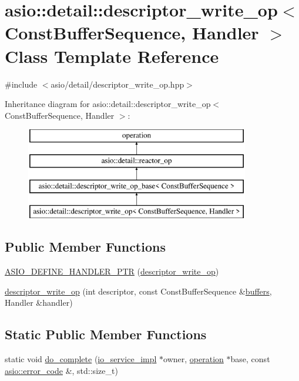 \hypertarget{classasio_1_1detail_1_1descriptor__write__op}{}\section{asio\+:\+:detail\+:\+:descriptor\+\_\+write\+\_\+op$<$ Const\+Buffer\+Sequence, Handler $>$ Class Template Reference}
\label{classasio_1_1detail_1_1descriptor__write__op}


{\ttfamily \#include $<$asio/detail/descriptor\+\_\+write\+\_\+op.\+hpp$>$}

Inheritance diagram for asio\+:\+:detail\+:\+:descriptor\+\_\+write\+\_\+op$<$ Const\+Buffer\+Sequence, Handler $>$\+:\begin{figure}[H]
\begin{center}
\leavevmode
\includegraphics[height=4.000000cm]{classasio_1_1detail_1_1descriptor__write__op}
\end{center}
\end{figure}
\subsection*{Public Member Functions}
\begin{DoxyCompactItemize}
\item 
\hyperlink{classasio_1_1detail_1_1descriptor__write__op_a71be8a5f4433a363ae686fedbf791026}{A\+S\+I\+O\+\_\+\+D\+E\+F\+I\+N\+E\+\_\+\+H\+A\+N\+D\+L\+E\+R\+\_\+\+P\+T\+R} (\hyperlink{classasio_1_1detail_1_1descriptor__write__op}{descriptor\+\_\+write\+\_\+op})
\item 
\hyperlink{classasio_1_1detail_1_1descriptor__write__op_a724881561745343c0d8e02a766c37be0}{descriptor\+\_\+write\+\_\+op} (int descriptor, const Const\+Buffer\+Sequence \&\hyperlink{group__async__read_ga54dede45c3175148a77fe6635222c47d}{buffers}, Handler \&handler)
\end{DoxyCompactItemize}
\subsection*{Static Public Member Functions}
\begin{DoxyCompactItemize}
\item 
static void \hyperlink{classasio_1_1detail_1_1descriptor__write__op_acfaa13c4493817c6ed5ecb2eb35a3eaa}{do\+\_\+complete} (\hyperlink{namespaceasio_1_1detail_a6d61d9b8e53c11288be549d82aec5a42}{io\+\_\+service\+\_\+impl} $\ast$owner, \hyperlink{namespaceasio_1_1detail_a338968609bec20e37145309f8f9ec936}{operation} $\ast$base, const \hyperlink{classasio_1_1error__code}{asio\+::error\+\_\+code} \&, std\+::size\+\_\+t)
\end{DoxyCompactItemize}
